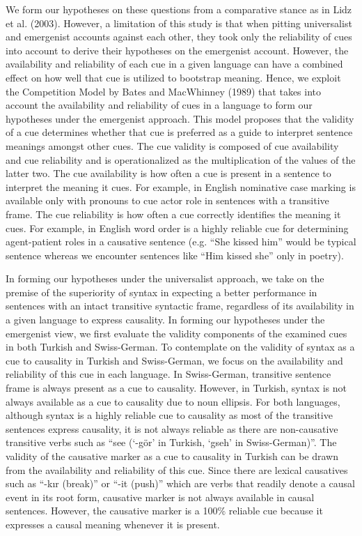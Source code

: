 \documentclass[man]{apa6}
\begin{document}
We form our hypotheses on these questions from a comparative stance as
in Lidz et al. (2003). However, a limitation of this study is that when
pitting universalist and emergenist accounts against each other, they
took only the reliability of cues into account to derive their
hypotheses on the emergenist account. However, the availability and
reliability of each cue in a given language can have a combined effect
on how well that cue is utilized to bootstrap meaning. Hence, we exploit
the Competition Model by Bates and MacWhinney (1989) that takes
into account the availability and reliability of cues in a language to
form our hypotheses under the emergenist approach. This model proposes
that the validity of a cue determines whether that cue is preferred as a
guide to interpret sentence meanings amongst other cues. The cue
validity is composed of cue availability and cue reliability and is
operationalized as the multiplication of the values of the latter two.
The cue availability is how often a cue is present in a sentence to
interpret the meaning it cues. For example, in English nominative case
marking is available only with pronouns to cue actor role in sentences
with a transitive frame. The cue reliability is how often a cue
correctly identifies the meaning it cues. For example, in English word
order is a highly reliable cue for determining agent-patient roles in a
causative sentence (e.g. \enquote{She kissed him} would be typical
sentence whereas we encounter sentences like \enquote{Him kissed she}
only in poetry).

In forming our hypotheses under the universalist approach, we take on
the premise of the superiority of syntax in expecting a better
performance in sentences with an intact transitive syntactic frame,
regardless of its availability in a given language to express causality.
In forming our hypotheses under the emergenist view, we first evaluate
the validity components of the examined cues in both Turkish and
Swiss-German. To contemplate on the validity of syntax as a cue to
causality in Turkish and Swiss-German, we focus on the availability and
reliability of this cue in each language. In Swiss-German, transitive
sentence frame is always present as a cue to causality. However, in
Turkish, syntax is not always available as a cue to causality due to
noun ellipsis. For both languages, although syntax is a highly reliable
cue to causality as most of the transitive sentences express causality,
it is not always reliable as there are non-causative transitive verbs
such as \enquote{see (\enquote{-gör} in Turkish, \enquote{gseh} in
Swiss-German)}. The validity of the causative marker as a cue to
causality in Turkish can be drawn from the availability and reliability
of this cue. Since there are lexical causatives such as \enquote{-kır
(break)} or \enquote{-it (push)} which are verbs that readily denote a
causal event in its root form, causative marker is not always available
in causal sentences. However, the causative marker is a 100\% reliable
cue because it expresses a causal meaning whenever it is present.
\end{document}
